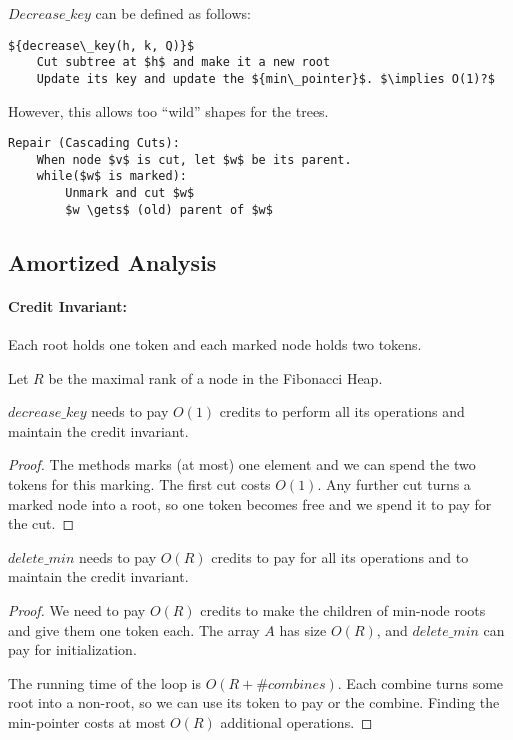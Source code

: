 ${Decrease\_key}$ can be defined as follows:

\begin{lstlisting}[mathescape]
${decrease\_key(h, k, Q)}$
    Cut subtree at $h$ and make it a new root
    Update its key and update the ${min\_pointer}$. $\implies O(1)?$
\end{lstlisting}

However, this allows too ``wild'' shapes for the trees.



\begin{lstlisting}[mathescape]
Repair (Cascading Cuts):
    When node $v$ is cut, let $w$ be its parent.
    while($w$ is marked):
        Unmark and cut $w$
        $w \gets$ (old) parent of $w$
\end{lstlisting}

\subsection{Amortized Analysis}

\paragraph{Credit Invariant:} Each root holds one token and each marked node holds two tokens.

Let $R$ be the maximal rank of a node in the Fibonacci Heap.

\begin{mylemma}
${decrease\_key}$ needs to pay $O(1)$ credits to perform all its operations and maintain the credit invariant.
\end{mylemma}
\begin{proof}
The methods marks (at most) one element and we can spend the two tokens for this marking. The first cut costs $O(1)$. Any further cut turns a marked node into a root, so one token becomes free and we spend it to pay for the cut.
\end{proof}

\begin{mylemma}
${delete\_min}$ needs to pay $O(R)$ credits to pay for all its operations and to maintain the credit invariant.
\end{mylemma}
\begin{proof}
We need to pay $O(R)$ credits to make the children of min-node roots and give them one token each. The array $A$ has size $O(R)$, and ${delete\_min}$ can pay for initialization.

The running time of the loop is $O(R + \# {combines})$. Each combine turns some root into a non-root, so we can use its token to pay or the combine. Finding the min-pointer costs at most $O(R)$ additional operations.
\end{proof}

